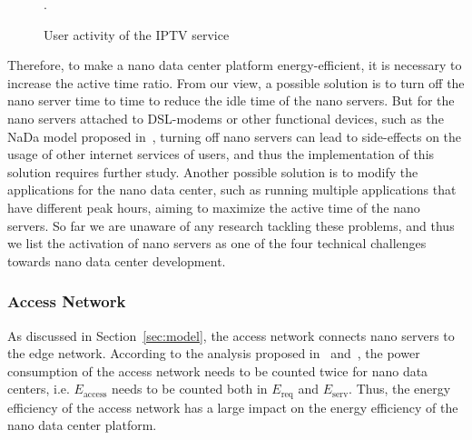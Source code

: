 \begin{figure}[h]
	\fontsize{12}{12} \selectfont
	\centerline{}
	\caption{User activity of the IPTV service~\cite{DBLP:conf/conext/ValanciusLMDR09}}.
	\label{fig:iptv}
	\normalsize
\end{figure}

Therefore, to make a nano data center platform energy-efficient,
it is necessary to increase the active time ratio.
From our view,
a possible solution is to turn off the nano server time to time to reduce the idle time of the nano servers.
But for the nano servers attached to DSL-modems or other functional devices,
such as the NaDa model proposed in~\cite{DBLP:conf/conext/ValanciusLMDR09},
turning off nano servers can lead to side-effects on the usage of other internet services of users,
and thus the implementation of this solution requires further study.
Another possible solution is to modify the applications for the nano data center,
such as running multiple applications that have different peak hours,
aiming to maximize the active time of the nano servers.
So far we are unaware of any research tackling these problems,
and thus we list the activation of nano servers as one of the four technical challenges towards nano data center development.

\subsubsection{Access Network}

As discussed in Section~\ref{sec:model}, the access network connects nano servers to the edge network.
According to the analysis proposed in~\cite{tradeoff} and~\cite{DBLP:journals/sigmetrics/JalaliAVHAT14},
the power consumption of the access network needs to be counted twice for nano data centers,
i.e. $E_\text{access}$ needs to be counted both in $E_\text{req}$ and $E_\text{serv}$.
Thus, the energy efficiency of the access network has a large impact on the energy efficiency of the nano data center platform.

